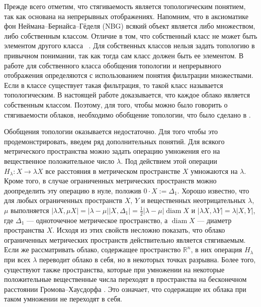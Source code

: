 \documentclass[11pt,twoside,draft
]{article}
\DeclareMathOperator{\diam}{diam}
\begin{document}
Прежде всего отметим, что стягиваемость является топологическим
понятием, так как основана на непрерывных отображениях. Напомним, что
в аксиоматике фон Неймана--Бернайса--Гёделя (NBG) всякий объект
является либо множеством, либо собственным классом.
Отличие в том, что собственный класс не может быть элементом другого
класса ~\cite{Neumann, Bernays, Godel}. Для собственных классов
нельзя задать топологию в привычном понимании, так как тогда сам
класс должен быть ее элементом.
В работе \cite{BorIvTuzh1}
для собственного класса обобщения топологии и непрерывного
отображения определяются с использованием понятия фильтрации множествами.
Если в классе существует такая фильтрация, то такой класс называется
топологическим.
В настоящей работе доказывается, что каждое облако является
собственным классом. Поэтому, для того, чтобы можно было говорить о
стягиваемости облаков, необходимо обобщение топологии, что было
сделано в \cite{BorIvTuzh1}.

Обобщения топологии оказывается недостаточно. Для того чтобы это
продемонстрировать, введем ряд дополнительных понятий.
Для всякого метрического пространства можно задать операцию умножения
его на вещественное положительное число $\lambda$.
Под действием этой операции $H_\lambda\colon X \rightarrow \lambda X$
все расстояния в метрическом пространстве $X$ умножаются на $\lambda$.
Кроме того, в случае ограниченных метрических пространств можно
доопределить эту операцию в нуле, положив $0\cdot X := \Delta_1$.
Хорошо известно, что для любых  ограниченных пространств $X$, $ Y$ и
вещественных неотрицательных $\lambda$, $\mu$ выполняется $|\lambda
X, \mu X| = |\lambda - \mu|\left|X,\Delta_1\right| = \frac  1 2
|\lambda - \mu|\diam X$ и $|\lambda X, \lambda Y| = \lambda |X,Y|$,
где $\Delta_1$ --- одноточечное метрическое пространство, а $\diam X$
--- диаметр пространства $X$.
Исходя из этих свойств несложно показать, что облако ограниченных
метрических пространств действительно является стягиваемым.
Если же рассматривать облако, содержащее пространство $\mathbb{R}^n$,
в них операция $H_\lambda$ при всех $\lambda$ переводит облако в
себя, но в некоторых точках разрывна.
Более того, существуют также пространства, которые при умножении на
некоторые положительные вещественные числа переходят в пространства
на бесконечном расстоянии Громова--Хаусдорфа \cite{TuzhBog1}. Это
означает, что содержащие их облака при таком умножении не переходят в себя.
\end{document}
